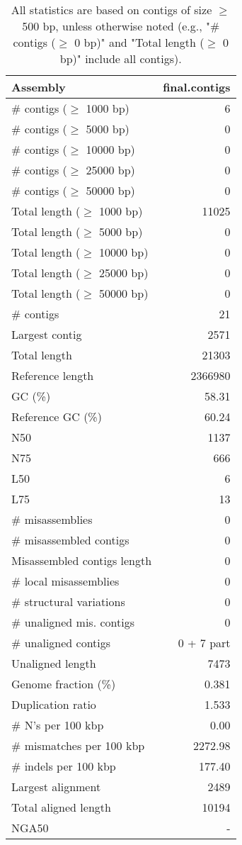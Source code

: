 \documentclass[12pt,a4paper]{article}
\begin{document}
\begin{table}[ht]
\begin{center}
\caption{All statistics are based on contigs of size $\geq$ 500 bp, unless otherwise noted (e.g., "\# contigs ($\geq$ 0 bp)" and "Total length ($\geq$ 0 bp)" include all contigs).}
\begin{tabular}{|l*{1}{|r}|}
\hline
Assembly & final.contigs \\ \hline
\# contigs ($\geq$ 1000 bp) & 6 \\ \hline
\# contigs ($\geq$ 5000 bp) & 0 \\ \hline
\# contigs ($\geq$ 10000 bp) & 0 \\ \hline
\# contigs ($\geq$ 25000 bp) & 0 \\ \hline
\# contigs ($\geq$ 50000 bp) & 0 \\ \hline
Total length ($\geq$ 1000 bp) & 11025 \\ \hline
Total length ($\geq$ 5000 bp) & 0 \\ \hline
Total length ($\geq$ 10000 bp) & 0 \\ \hline
Total length ($\geq$ 25000 bp) & 0 \\ \hline
Total length ($\geq$ 50000 bp) & 0 \\ \hline
\# contigs & 21 \\ \hline
Largest contig & 2571 \\ \hline
Total length & 21303 \\ \hline
Reference length & 2366980 \\ \hline
GC (\%) & 58.31 \\ \hline
Reference GC (\%) & 60.24 \\ \hline
N50 & 1137 \\ \hline
N75 & 666 \\ \hline
L50 & 6 \\ \hline
L75 & 13 \\ \hline
\# misassemblies & 0 \\ \hline
\# misassembled contigs & 0 \\ \hline
Misassembled contigs length & 0 \\ \hline
\# local misassemblies & 0 \\ \hline
\# structural variations & 0 \\ \hline
\# unaligned mis. contigs & 0 \\ \hline
\# unaligned contigs & 0 + 7 part \\ \hline
Unaligned length & 7473 \\ \hline
Genome fraction (\%) & 0.381 \\ \hline
Duplication ratio & 1.533 \\ \hline
\# N's per 100 kbp & 0.00 \\ \hline
\# mismatches per 100 kbp & 2272.98 \\ \hline
\# indels per 100 kbp & 177.40 \\ \hline
Largest alignment & 2489 \\ \hline
Total aligned length & 10194 \\ \hline
NGA50 & - \\ \hline
\end{tabular}
\end{center}
\end{table}
\end{document}
